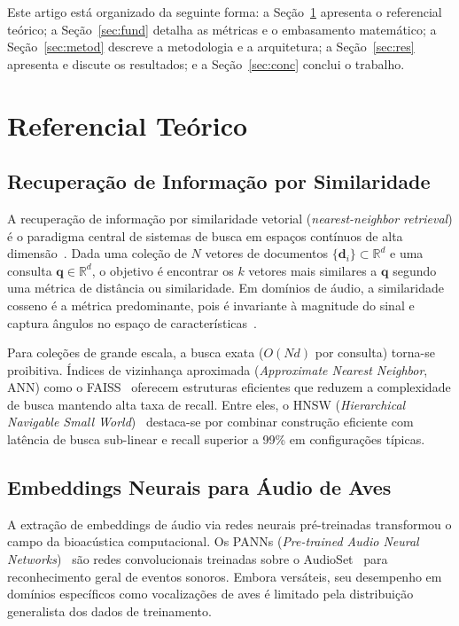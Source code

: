 \documentclass[12pt]{article}
\begin{document}
Este artigo está organizado da seguinte forma: a Seção~\ref{sec:ref} apresenta
o referencial teórico; a Seção~\ref{sec:fund} detalha as métricas e o
embasamento matemático; a Seção~\ref{sec:metod} descreve a metodologia e a
arquitetura; a Seção~\ref{sec:res} apresenta e discute os resultados; e a
Seção~\ref{sec:conc} conclui o trabalho.

\section{Referencial Teórico}
\label{sec:ref}

\subsection{Recuperação de Informação por Similaridade}

A recuperação de informação por similaridade vetorial (\textit{nearest-neighbor
retrieval}) é o paradigma central de sistemas de busca em espaços contínuos de
alta dimensão~\cite{baeza:99}. Dada uma coleção de $N$ vetores de documentos
$\{\mathbf{d}_i\} \subset \mathbb{R}^d$ e uma consulta $\mathbf{q} \in
\mathbb{R}^d$, o objetivo é encontrar os $k$ vetores mais similares a
$\mathbf{q}$ segundo uma métrica de distância ou similaridade. Em domínios de
áudio, a similaridade cosseno é a métrica predominante, pois é invariante à
magnitude do sinal e captura ângulos no espaço de características~\cite{kong:20}.

Para coleções de grande escala, a busca exata ($O(Nd)$ por consulta) torna-se
proibitiva. Índices de vizinhança aproximada (\textit{Approximate Nearest
Neighbor}, ANN) como o FAISS~\cite{johnson:21} oferecem estruturas eficientes
que reduzem a complexidade de busca mantendo alta taxa de recall. Entre eles,
o HNSW (\textit{Hierarchical Navigable Small World})~\cite{malkov:20}
destaca-se por combinar construção eficiente com latência de busca sub-linear
e recall superior a 99\% em configurações típicas.

\subsection{Embeddings Neurais para Áudio de Aves}

A extração de embeddings de áudio via redes neurais pré-treinadas transformou
o campo da bioacústica computacional. Os PANNs (\textit{Pre-trained Audio
Neural Networks})~\cite{kong:20} são redes convolucionais treinadas sobre o
AudioSet~\cite{gemmeke:17} para reconhecimento geral de eventos sonoros. Embora
versáteis, seu desempenho em domínios específicos como vocalizações de aves é
limitado pela distribuição generalista dos dados de treinamento.
\end{document}
